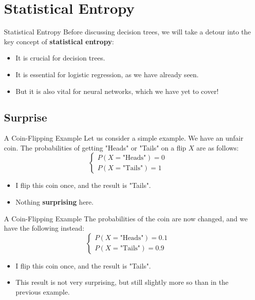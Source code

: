 \section[Statistical Entropy]{Statistical Entropy}

\begin{frame}{Statistical Entropy}
	Before discussing decision trees, we will take a detour into the key concept of \textbf{statistical entropy}:
	
	\begin{itemize}
		\item It is crucial for decision trees.
		\pause
		\item It is essential for logistic regression, as we have already seen.
		\pause
		\item But it is also vital for neural networks, which we have yet to cover!
	\end{itemize}
\end{frame}

\subsection[Surprise]{Surprise}

\begin{frame}{A Coin-Flipping Example}
	Let us consider a simple example. We have an unfair coin. The probabilities of getting "Heads" or "Tails" on a flip $X$ are as follows:
	\begin{equation*}
		\begin{cases}
			P(X = \text{"Heads"}) = 0 \\
			P(X = \text{"Tails"}) = 1
		\end{cases}
	\end{equation*}
	\pause
	\begin{itemize}
		\item I flip this coin once, and the result is "Tails".
		\item Nothing \textbf{surprising} here.
	\end{itemize}
\end{frame}

\begin{frame}{A Coin-Flipping Example}
	The probabilities of the coin are now changed, and we have the following instead:
	\begin{equation*}
		\begin{cases}
			P(X = \text{"Heads"}) = 0.1 \\
			P(X = \text{"Tails"}) = 0.9
		\end{cases}
	\end{equation*}
	\pause
	\begin{itemize}
		\item I flip this coin once, and the result is "Tails".
		\item This result is not very surprising, but still slightly more so than in the previous example.
	\end{itemize}
\end{frame}

